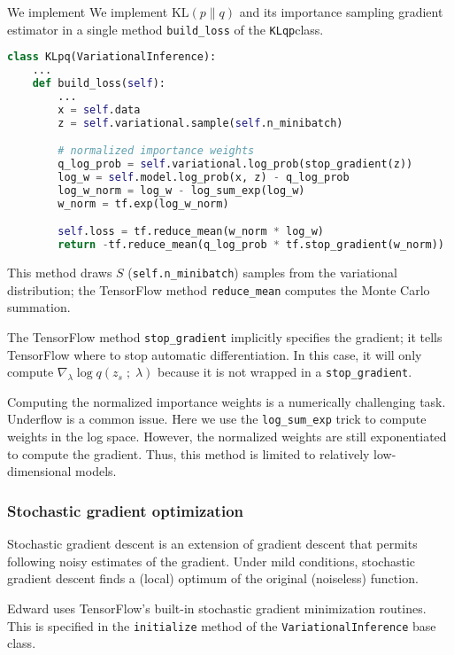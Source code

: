 We implement
We implement $\text{KL}(p\|q)$ and its importance sampling gradient
estimator in a single method \texttt{build_loss} of the \texttt{KLqp}class.
\begin{lstlisting}[language=Python]
class KLpq(VariationalInference):
    ...
    def build_loss(self):
        ...
        x = self.data
        z = self.variational.sample(self.n_minibatch)

        # normalized importance weights
        q_log_prob = self.variational.log_prob(stop_gradient(z))
        log_w = self.model.log_prob(x, z) - q_log_prob
        log_w_norm = log_w - log_sum_exp(log_w)
        w_norm = tf.exp(log_w_norm)

        self.loss = tf.reduce_mean(w_norm * log_w)
        return -tf.reduce_mean(q_log_prob * tf.stop_gradient(w_norm))
\end{lstlisting}

This method draws $S$ (\texttt{self.n_minibatch}) samples from the variational
distribution; the TensorFlow method \texttt{reduce_mean} computes the Monte
Carlo summation. 

The TensorFlow method \texttt{stop_gradient} implicitly specifies the gradient; 
it tells TensorFlow where to stop automatic differentiation. In
this case, it will only compute $\nabla_\lambda \log q(z_s\;;\;\lambda)$ because
it is not wrapped in a \texttt{stop_gradient}.

Computing the normalized importance weights is a numerically challenging task.
Underflow is a common issue. Here we use the \texttt{log_sum_exp} trick to
compute weights in the log space. However, the normalized weights are still
exponentiated to compute the gradient. Thus, this method is limited to
relatively low-dimensional models.

\subsubsection{Stochastic gradient optimization}

Stochastic gradient descent is an extension of gradient descent that permits
following noisy estimates of the gradient. Under mild conditions, stochastic
gradient descent finds a (local) optimum of the original (noiseless) function.

Edward uses TensorFlow's built-in stochastic gradient minimization routines.
This is specified in the \texttt{initialize} method of the 
\texttt{VariationalInference} base class.

